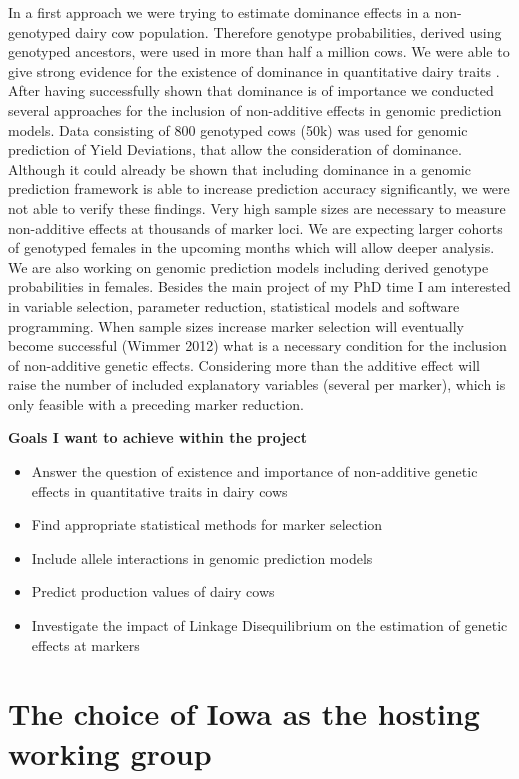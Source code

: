 \documentclass[a4paper,DIVcalc,12pt,liststotoc,headsepline,plainheadsepline]{scrartcl}
\begin{document}
In a first approach we were trying to estimate dominance effects in a non-genotyped dairy cow population. Therefore genotype probabilities, derived using genotyped ancestors, were used in more than half a million cows. We were able to give strong evidence for the existence of dominance in quantitative dairy traits \citep{teide}.
After having successfully shown that dominance is of importance we conducted several approaches for the inclusion of non-additive effects in genomic prediction models. Data consisting of 800 genotyped cows (50k) was used for genomic prediction of Yield Deviations, that allow the consideration of dominance. Although it could already be shown that including dominance in a genomic prediction framework \citep{maus} is able to increase prediction accuracy significantly, we were not able to verify these findings. Very high sample sizes are necessary to measure non-additive effects at thousands of marker loci. 
We are expecting larger cohorts of genotyped females in the upcoming months which will allow deeper analysis. We are also working on genomic prediction models including derived genotype probabilities in females.
Besides the main project of my PhD time I am interested in variable selection, parameter reduction, statistical models and software programming. When sample sizes increase marker selection will eventually become successful (Wimmer 2012) what is a necessary condition for the inclusion of non-additive genetic effects. Considering more than the  additive effect will raise the number of included explanatory variables (several per marker), which is only feasible with a preceding marker reduction.

\textbf{Goals I want to achieve within the project}

\begin{itemize}
\item Answer the question of existence and importance of non-additive genetic effects in quantitative traits in dairy cows
\item Find appropriate statistical methods for marker selection 
\item Include allele interactions in genomic prediction models
\item Predict production values of dairy cows
\item Investigate the impact of Linkage Disequilibrium on the estimation of genetic effects at markers 
\end{itemize}
\clearpage


\section{The choice of Iowa as the hosting working group}
\end{document}
